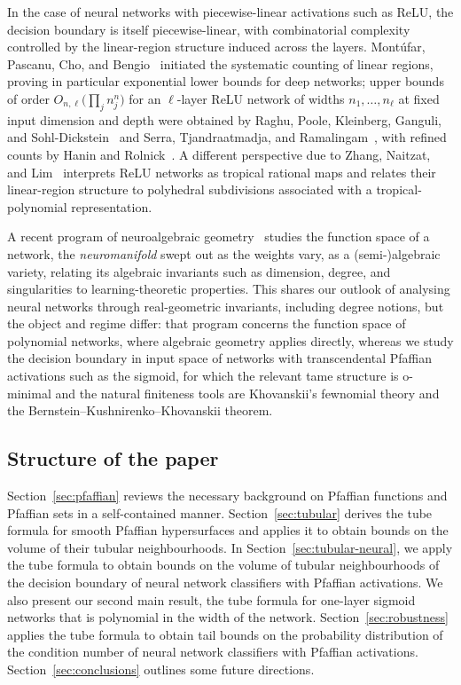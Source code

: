 In the case of neural networks with piecewise-linear activations such as ReLU, the decision boundary is itself piecewise-linear, with combinatorial complexity controlled by the linear-region structure induced across the layers. Mont\'ufar, Pascanu, Cho, and Bengio~\cite{montufar2014} initiated the systematic counting of linear regions, proving in particular exponential lower bounds for deep networks; upper bounds of order $O_{n,\ell}\!\bigl(\prod_j n_j^n\bigr)$ for an $\ell$-layer ReLU network of widths $n_1, \ldots, n_\ell$ at fixed input dimension and depth were obtained by Raghu, Poole, Kleinberg, Ganguli, and Sohl-Dickstein~\cite{raghu2017} and Serra, Tjandraatmadja, and Ramalingam~\cite{serra2018}, with refined counts by Hanin and Rolnick~\cite{hanin2019}. A different perspective due to Zhang, Naitzat, and Lim~\cite{zhang2018tropical} interprets ReLU networks as tropical rational maps and relates their linear-region structure to polyhedral subdivisions associated with a tropical-polynomial representation.

A recent program of neuroalgebraic geometry~\cite{marchetti2025neuroalgebraic} studies the function space of a network, the \emph{neuromanifold} swept out as the weights vary, as a (semi-)algebraic variety, relating its algebraic invariants such as dimension, degree, and singularities to learning-theoretic properties. This shares our outlook of analysing neural networks through real-geometric invariants, including degree notions, but the object and regime differ: that program concerns the function space of polynomial networks, where algebraic geometry applies directly, whereas we study the decision boundary in input space of networks with transcendental Pfaffian activations such as the sigmoid, for which the relevant tame structure is o-minimal and the natural finiteness tools are Khovanskii's fewnomial theory and the Bernstein--Kushnirenko--Khovanskii theorem. 

\subsection{Structure of the paper}
Section~\ref{sec:pfaffian} reviews the necessary background on Pfaffian functions and Pfaffian sets in a self-contained manner. Section~\ref{sec:tubular} derives the tube formula for smooth Pfaffian hypersurfaces and applies it to obtain bounds on the volume of their tubular neighbourhoods. In Section~\ref{sec:tubular-neural}, we apply the tube formula to obtain bounds on the volume of tubular neighbourhoods of the decision boundary of neural network classifiers with Pfaffian activations. We also present our second main result, the tube formula for one-layer sigmoid networks that is polynomial in the width of the network. Section~\ref{sec:robustness} applies the tube formula to obtain tail bounds on the probability distribution of the condition number of neural network classifiers with Pfaffian activations. Section~\ref{sec:conclusions} outlines some future directions.

